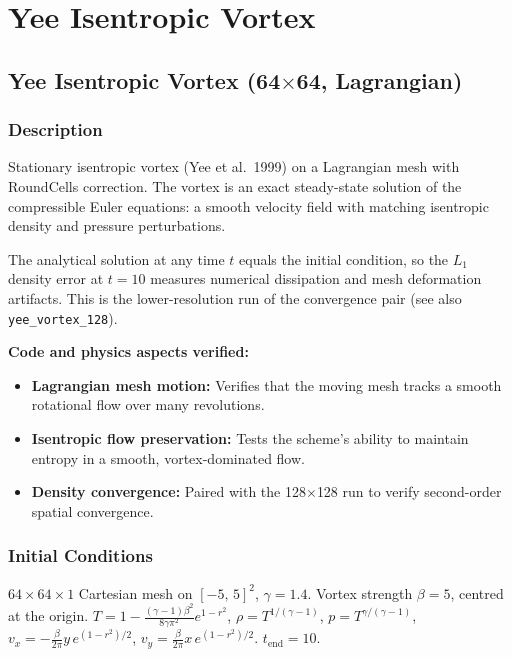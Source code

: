 \documentclass[11pt,a4paper]{article}
\begin{document}
\newpage

\section{Yee Isentropic Vortex}
\label{sec:yee_vortex}

\subsection{Yee Isentropic Vortex (64$\times$64, Lagrangian)}
\label{sec:yee_vortex_64}

\subsubsection*{Description}
Stationary isentropic vortex (Yee et al.\ 1999) on a Lagrangian mesh with RoundCells correction. The vortex is an exact steady-state solution of the compressible Euler equations: a smooth velocity field with matching isentropic density and pressure perturbations.

The analytical solution at any time $t$ equals the initial condition, so the $L_1$ density error at $t=10$ measures numerical dissipation and mesh deformation artifacts. This is the lower-resolution run of the convergence pair (see also \texttt{yee\_vortex\_128}).

\textbf{Code and physics aspects verified:}
\begin{itemize}
  \item \textbf{Lagrangian mesh motion:} Verifies that the moving mesh tracks a smooth rotational flow over many revolutions.
  \item \textbf{Isentropic flow preservation:} Tests the scheme's ability to maintain entropy in a smooth, vortex-dominated flow.
  \item \textbf{Density convergence:} Paired with the 128$\times$128 run to verify second-order spatial convergence.
\end{itemize}

\subsubsection*{Initial Conditions}
$64\times64\times1$ Cartesian mesh on $[-5,\,5]^2$, $\gamma = 1.4$. Vortex strength $\beta = 5$, centred at the origin. $T = 1 - \frac{(\gamma-1)\beta^2}{8\gamma\pi^2} e^{1-r^2}$, $\rho = T^{1/(\gamma-1)}$, $p = T^{\gamma/(\gamma-1)}$, $v_x = -\frac{\beta}{2\pi} y\, e^{(1-r^2)/2}$, $v_y = \frac{\beta}{2\pi} x\, e^{(1-r^2)/2}$. $t_{\mathrm{end}} = 10$.
\end{document}
